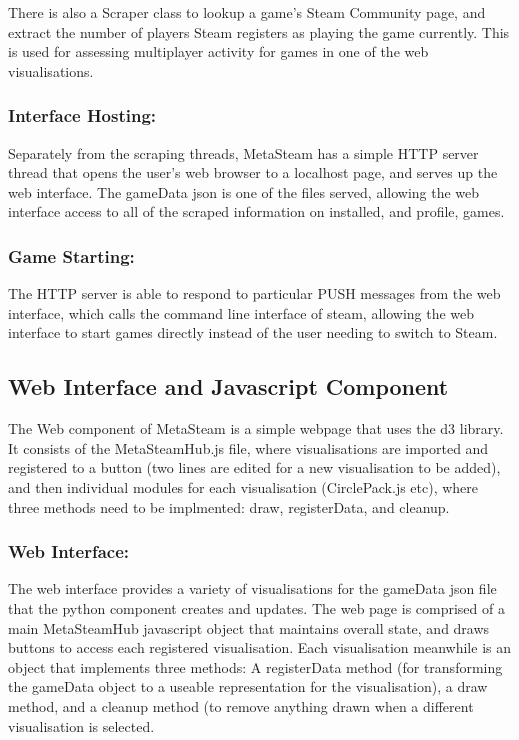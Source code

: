 \documentclass[11pt]{article}
\begin{document}
There is also a Scraper class to lookup a game's Steam Community page, and extract the number of players Steam registers as playing the game currently. This is used for assessing multiplayer activity for games in one of the web visualisations.


\subsubsection*{Interface Hosting:}
Separately from the scraping threads, MetaSteam has a simple HTTP server thread that opens the user's web browser to a localhost page, and serves up the web interface. The gameData json is one of the files served, allowing the web interface access to all of the scraped information on installed, and profile, games.

\subsubsection*{Game Starting:}
The HTTP server is able to respond to particular PUSH messages from the web interface, which calls the command line interface of steam, allowing the web interface to start games directly instead of the user needing to switch to Steam.

\subsection{Web Interface and Javascript Component}
The Web component of MetaSteam is a simple webpage that uses the d3 library. It consists of the MetaSteamHub.js file, where visualisations are imported and registered to a button (two lines are edited for a new visualisation to be added), and then individual modules for each visualisation (CirclePack.js etc), where three methods need to be implmented: draw, registerData, and cleanup.

\subsubsection*{Web Interface:}
The web interface provides a variety of visualisations for the gameData json file that the python component creates and updates. The web page is comprised of a main MetaSteamHub javascript object that maintains overall state, and draws buttons to access each registered visualisation. Each visualisation meanwhile is an object that implements three methods: A registerData method (for transforming the gameData object to a useable representation for the visualisation), a draw method, and a cleanup method (to remove anything drawn when a different visualisation is selected.
\end{document}
